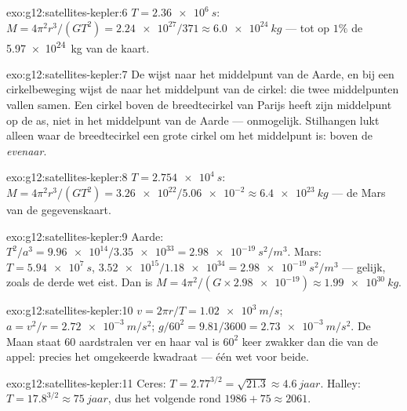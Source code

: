 \begin{solution}{exo:g12:satellites-kepler:6}
$T = \qty{2.36e6}{s}$: $M = 4\pi^2 r^3/(GT^2) = \num{2.24e27}/371 \approx
\qty{6.0e24}{kg}$ --- tot op $1\%$ de \qty{5.97e24}{kg} van de kaart.
\end{solution}

\begin{solution}{exo:g12:satellites-kepler:7}
De  wijst naar het middelpunt van de Aarde, en bij een
cirkelbeweging wijst de  naar het middelpunt van de
cirkel: die twee middelpunten vallen samen. Een cirkel boven de breedtecirkel
van Parijs heeft zijn middelpunt op de as, niet in het middelpunt van de
Aarde --- onmogelijk. Stilhangen lukt alleen waar de breedtecirkel een grote
cirkel om het middelpunt is: boven de \emph{evenaar}.
\end{solution}

\begin{solution}{exo:g12:satellites-kepler:8}
$T = \qty{2.754e4}{s}$: $M = 4\pi^2 r^3/(GT^2) =
\num{3.26e22}/\num{5.06e-2} \approx \qty{6.4e23}{kg}$ --- de Mars van de
gegevenskaart.
\end{solution}

\begin{solution}{exo:g12:satellites-kepler:9}
Aarde: $T^2/a^3 = \num{9.96e14}/\num{3.35e33} = \qty{2.98e-19}{s^2/m^3}$.
Mars: $T = \qty{5.94e7}{s}$, $\num{3.52e15}/\num{1.18e34} =
\qty{2.98e-19}{s^2/m^3}$ --- gelijk, zoals de derde wet eist. Dan is
$M = 4\pi^2/(G \times \num{2.98e-19}) \approx \qty{1.99e30}{kg}$.
\end{solution}

\begin{solution}{exo:g12:satellites-kepler:10}
$v = 2\pi r/T = \qty{1.02e3}{m/s}$; $a = v^2/r = \qty{2.72e-3}{m/s^2}$;
$g/60^2 = 9.81/3600 = \qty{2.73e-3}{m/s^2}$. De Maan staat $60$ aardstralen
ver en haar val is $60^2$ keer zwakker dan die van de appel: precies het
omgekeerde kwadraat --- één wet voor beide.
\end{solution}

\begin{solution}{exo:g12:satellites-kepler:11}
Ceres: $T = 2.77^{3/2} = \sqrt{21.3} \approx \qty{4.6}{jaar}$. Halley:
$T = 17.8^{3/2} \approx \qty{75}{jaar}$, dus het volgende  rond
$1986 + 75 \approx 2061$.
\end{solution}

